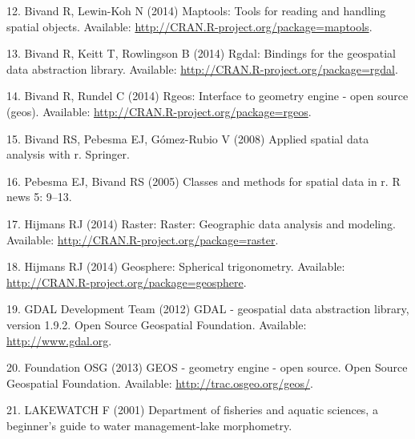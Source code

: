 \documentclass[11pt,]{article}
\begin{document}
\hypertarget{ref-bivand2014maptools}{}
12. Bivand R, Lewin-Koh N (2014) Maptools: Tools for reading and
handling spatial objects. Available:
\url{http://CRAN.R-project.org/package=maptools}.

\hypertarget{ref-bivand2014rgdal}{}
13. Bivand R, Keitt T, Rowlingson B (2014) Rgdal: Bindings for the
geospatial data abstraction library. Available:
\url{http://CRAN.R-project.org/package=rgdal}.

\hypertarget{ref-bivand2014rgeos}{}
14. Bivand R, Rundel C (2014) Rgeos: Interface to geometry engine - open
source (geos). Available: \url{http://CRAN.R-project.org/package=rgeos}.

\hypertarget{ref-bivand2008applied}{}
15. Bivand RS, Pebesma EJ, Gómez-Rubio V (2008) Applied spatial data
analysis with r. Springer.

\hypertarget{ref-pebesma2005sp}{}
16. Pebesma EJ, Bivand RS (2005) Classes and methods for spatial data in
r. R news 5: 9--13.

\hypertarget{ref-hijmans2014raster}{}
17. Hijmans RJ (2014) Raster: Raster: Geographic data analysis and
modeling. Available: \url{http://CRAN.R-project.org/package=raster}.

\hypertarget{ref-hijmans2014geosphere}{}
18. Hijmans RJ (2014) Geosphere: Spherical trigonometry. Available:
\url{http://CRAN.R-project.org/package=geosphere}.

\hypertarget{ref-GDAL2012}{}
19. GDAL Development Team (2012) GDAL - geospatial data abstraction
library, version 1.9.2. Open Source Geospatial Foundation. Available:
\href{\%20http://www.gdal.org}{http://www.gdal.org}.

\hypertarget{ref-GEOS2013}{}
20. Foundation OSG (2013) GEOS - geometry engine - open source. Open
Source Geospatial Foundation. Available:
\url{http://trac.osgeo.org/geos/}.

\hypertarget{ref-lakewatch2001department}{}
21. LAKEWATCH F (2001) Department of fisheries and aquatic sciences, a
beginner's guide to water management-lake morphometry.
\end{document}
